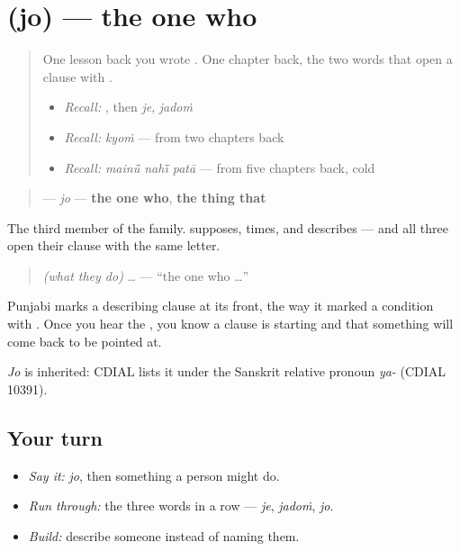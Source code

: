 \section[\texorpdfstring{\pa{ਜੋ} (jo)}{ਜੋ (jo)}]{ (jo) — the one who}

\label{lesson:PA-C42-jo}



\begin{quote}
One lesson back you wrote \textbf{}. One chapter back, the two words that open a clause with \textbf{}.

\begin{itemize}
\raggedright
  \item \emph{Recall:} \textbf{}, then \emph{je}, \emph{jadoṁ}
  \item \emph{Recall:} \emph{kyoṁ} — from two chapters back
  \item \emph{Recall:} \emph{mainū̃ nahī̃ patā} — from five chapters back, cold
\end{itemize}
\end{quote}

\begin{cousinweb}
\begin{quote}
\textbf{} — \emph{jo} — \textbf{the one who}, \textbf{the thing that}
\end{quote}

The third member of the family. \textbf{} supposes, \textbf{} times, and \textbf{} describes — and all three open their clause with the same letter.

\begin{quote}
\textbf{} \emph{(what they do)} … — \textquotedblleft{}the one who …\textquotedblright{}
\end{quote}

Punjabi marks a describing clause at its front, the way it marked a condition with \textbf{}. Once you hear the \textbf{}, you know a clause is starting and that something will come back to be pointed at.

\emph{Jo} is inherited: CDIAL lists it under the Sanskrit relative pronoun \emph{ya-} (CDIAL 10391).
\end{cousinweb}

\subsection*{Your turn}
\begin{itemize}
\raggedright
  \item \emph{Say it:} \emph{jo}, then something a person might do.
  \item \emph{Run through:} the three \textbf{} words in a row — \emph{je}, \emph{jadoṁ}, \emph{jo}.
  \item \emph{Build:} describe someone instead of naming them.
\end{itemize}

